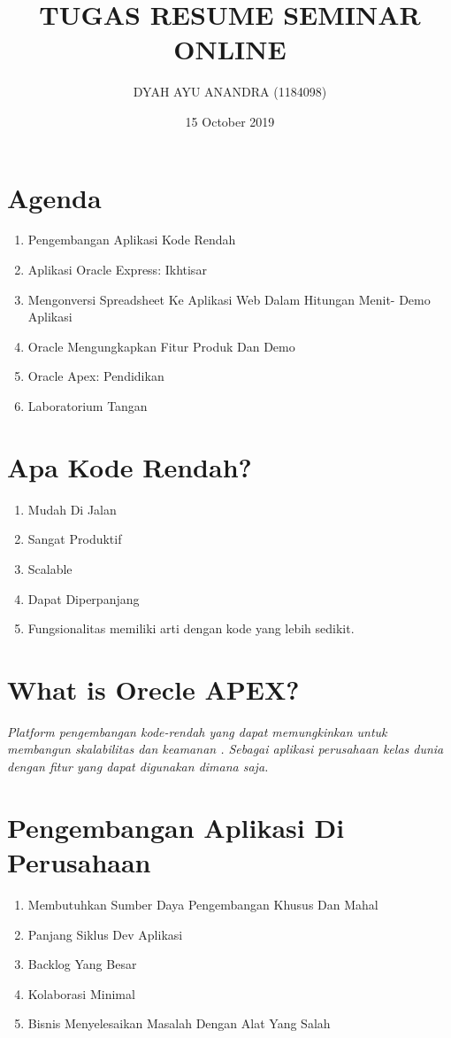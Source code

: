 \documentclass{article}
\title{TUGAS RESUME SEMINAR ONLINE}
\author{DYAH AYU ANANDRA (1184098)}
\date{15 October 2019}
\begin{document}
\maketitle

\section{Agenda}
\begin{enumerate}
    \item Pengembangan Aplikasi Kode Rendah
    \item Aplikasi Oracle Express: Ikhtisar
    \item Mengonversi Spreadsheet Ke Aplikasi Web Dalam Hitungan Menit- Demo Aplikasi
    \item Oracle Mengungkapkan Fitur Produk Dan Demo
    \item Oracle Apex: Pendidikan
    \item Laboratorium Tangan
\end{enumerate}

\section{Apa Kode Rendah?}
\begin{enumerate}
    \item Mudah Di Jalan
    \item Sangat Produktif
    \item Scalable
    \item Dapat Diperpanjang
    \item Fungsionalitas memiliki arti dengan kode yang lebih sedikit.
\end{enumerate}

\section{What is Orecle APEX?}
\textit{Platform pengembangan kode-rendah  yang dapat memungkinkan untuk membangun skalabilitas dan keamanan . Sebagai aplikasi perusahaan kelas dunia dengan fitur yang dapat digunakan dimana saja.}

\section{Pengembangan Aplikasi Di Perusahaan}
\begin{enumerate}
    \item Membutuhkan Sumber Daya Pengembangan Khusus Dan Mahal 
    \item Panjang Siklus Dev Aplikasi
    \item Backlog Yang Besar 
    \item Kolaborasi Minimal
    \item Bisnis Menyelesaikan Masalah Dengan Alat Yang Salah
\end{enumerate}
\end{document}

